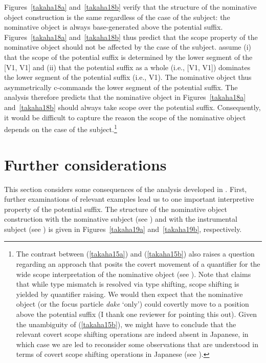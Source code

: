 \documentclass[output=paper]{langscibook}
\begin{document}
Figures~\ref{takaha18a} and~\ref{takaha18b} verify that the structure of the nominative object construction is the same regardless of the case of the subject: the nominative object is always base-generated above the potential suffix. Figures~\ref{takaha18a} and~\ref{takaha18b} thus predict that the scope property of the nominative object should not be affected by the case of the subject. \citet{SaitoHoshi1998} assume (i) that the scope of the potential suffix is determined by the lower segment of the [V1, V1] and (ii) that the potential suffix as a whole (i.e., [V1, V1]) dominates the lower segment of the potential suffix (i.e., V1). The nominative object thus asymmetrically c-commands the lower segment of the potential suffix. The analysis therefore predicts that the nominative object in Figures~\ref{takaha18a} and~\ref{takaha18b} should always take scope over the potential suffix. Consequently, it would be difficult to capture the reason the scope of the nominative object depends on the case of the subject.\footnote{The contrast between (\ref{takaha15a}) and (\ref{takaha15b}) also raises a question regarding an approach that posits the covert movement of a quantifier for the wide scope interpretation of the nominative object (see \citealt{bobaljikwurmbrand2007, takahashi2011, FunakoshiTakahashi2014}). Note that \citet{Blok2017} claims that while type mismatch is resolved via type shifting, scope shifting is yielded by quantifier raising. We would then expect that the nominative object (or the focus particle \emph{dake} ‘only’) could covertly move to a position above the potential suffix (I thank one reviewer for pointing this out). Given the unambiguity of (\ref{takaha15b}), we might have to conclude that the relevant covert scope shifting operations are indeed absent in Japanese, in which case we are led to reconsider some observations that are understood in terms of covert scope shifting operations in Japanese (see \citealt{takahashi2011, BobaljikWurmbrand2012, Oku2018}).}

\section{Further considerations}\label{takahas5}
This section considers some consequences of the analysis developed in . First, further examinations of relevant examples lead us to one important interpretive property of the potential suffix. The structure of the nominative object construction with the nominative subject (see ) and with the instrumental subject (see ) is given in Figures~\ref{takaha19a} and~\ref{takaha19b}, respectively.
\end{document}
